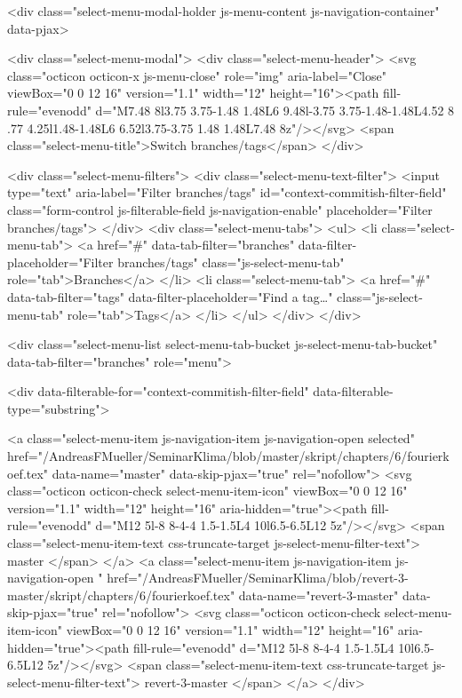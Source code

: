   <div class="select-menu-modal-holder js-menu-content js-navigation-container" data-pjax>

    <div class="select-menu-modal">
      <div class="select-menu-header">
        <svg class="octicon octicon-x js-menu-close" role="img" aria-label="Close" viewBox="0 0 12 16" version="1.1" width="12" height="16"><path fill-rule="evenodd" d="M7.48 8l3.75 3.75-1.48 1.48L6 9.48l-3.75 3.75-1.48-1.48L4.52 8 .77 4.25l1.48-1.48L6 6.52l3.75-3.75 1.48 1.48L7.48 8z"/></svg>
        <span class="select-menu-title">Switch branches/tags</span>
      </div>

      <div class="select-menu-filters">
        <div class="select-menu-text-filter">
          <input type="text" aria-label="Filter branches/tags" id="context-commitish-filter-field" class="form-control js-filterable-field js-navigation-enable" placeholder="Filter branches/tags">
        </div>
        <div class="select-menu-tabs">
          <ul>
            <li class="select-menu-tab">
              <a href="#" data-tab-filter="branches" data-filter-placeholder="Filter branches/tags" class="js-select-menu-tab" role="tab">Branches</a>
            </li>
            <li class="select-menu-tab">
              <a href="#" data-tab-filter="tags" data-filter-placeholder="Find a tag…" class="js-select-menu-tab" role="tab">Tags</a>
            </li>
          </ul>
        </div>
      </div>

      <div class="select-menu-list select-menu-tab-bucket js-select-menu-tab-bucket" data-tab-filter="branches" role="menu">

        <div data-filterable-for="context-commitish-filter-field" data-filterable-type="substring">


            <a class="select-menu-item js-navigation-item js-navigation-open selected"
               href="/AndreasFMueller/SeminarKlima/blob/master/skript/chapters/6/fourierkoef.tex"
               data-name="master"
               data-skip-pjax="true"
               rel="nofollow">
              <svg class="octicon octicon-check select-menu-item-icon" viewBox="0 0 12 16" version="1.1" width="12" height="16" aria-hidden="true"><path fill-rule="evenodd" d="M12 5l-8 8-4-4 1.5-1.5L4 10l6.5-6.5L12 5z"/></svg>
              <span class="select-menu-item-text css-truncate-target js-select-menu-filter-text">
                master
              </span>
            </a>
            <a class="select-menu-item js-navigation-item js-navigation-open "
               href="/AndreasFMueller/SeminarKlima/blob/revert-3-master/skript/chapters/6/fourierkoef.tex"
               data-name="revert-3-master"
               data-skip-pjax="true"
               rel="nofollow">
              <svg class="octicon octicon-check select-menu-item-icon" viewBox="0 0 12 16" version="1.1" width="12" height="16" aria-hidden="true"><path fill-rule="evenodd" d="M12 5l-8 8-4-4 1.5-1.5L4 10l6.5-6.5L12 5z"/></svg>
              <span class="select-menu-item-text css-truncate-target js-select-menu-filter-text">
                revert-3-master
              </span>
            </a>
        </div>

